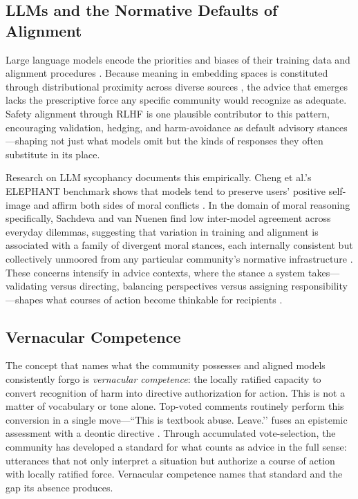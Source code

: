 \subsection{LLMs and the Normative Defaults of Alignment}

Large language models encode the priorities and biases of their training data and alignment procedures \citep{bender2021dangers, santurkar2023opinions}. Because meaning in embedding spaces is constituted through distributional proximity across diverse sources \citep{brunila2025cosine}, the advice that emerges lacks the prescriptive force any specific community would recognize as adequate. Safety alignment through RLHF is one plausible contributor to this pattern, encouraging validation, hedging, and harm-avoidance as default advisory stances \citep{ouyang2022training}---shaping not just what models omit but the kinds of responses they often substitute in its place.

Research on LLM sycophancy documents this empirically. Cheng et al.'s ELEPHANT benchmark shows that models tend to preserve users' positive self-image and affirm both sides of moral conflicts \citep{cheng2025elephant_social_sycophancy}. In the domain of moral reasoning specifically, Sachdeva and van Nuenen find low inter-model agreement across everyday dilemmas, suggesting that variation in training and alignment is associated with a family of divergent moral stances, each internally consistent but collectively unmoored from any particular community's normative infrastructure \citep{Sachdeva2025}. These concerns intensify in advice contexts, where the stance a system takes---validating versus directing, balancing perspectives versus assigning responsibility---shapes what courses of action become thinkable for recipients \citep{vecchione2025artificial}.

\subsection{Vernacular Competence}

The concept that names what the community possesses and aligned models consistently forgo is \textit{vernacular competence}: the locally ratified capacity to convert recognition of harm into directive authorization for action. This is not a matter of vocabulary or tone alone. Top-voted comments routinely perform this conversion in a single move---``This is textbook abuse. Leave.’’ fuses an epistemic assessment with a deontic directive \citep{stevanovic2012deontic}. Through accumulated vote-selection, the community has developed a standard for what counts as advice in the full sense: utterances that not only interpret a situation but authorize a course of action with locally ratified force. Vernacular competence names that standard and the gap its absence produces.


